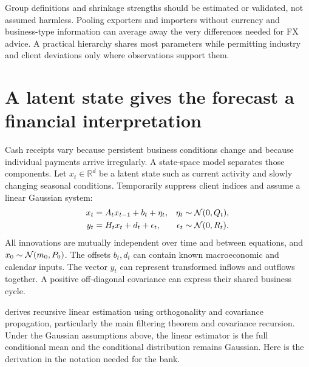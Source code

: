Group definitions and shrinkage strengths should be estimated or validated, not assumed harmless. Pooling exporters and importers without currency and business-type information can average away the very differences needed for FX advice. A practical hierarchy shares most parameters while permitting industry and client deviations only where observations support them.

\section{A latent state gives the forecast a financial interpretation}
\label{sec:kalman}
Cash receipts vary because persistent business conditions change and because individual payments arrive irregularly. A state-space model separates those components. Let $x_t\in\mathbb R^d$ be a latent state such as current activity and slowly changing seasonal conditions. Temporarily suppress client indices and assume a linear Gaussian system:
\begin{align}
x_t&=A_t x_{t-1}+b_t+\eta_t,&\eta_t&\sim\mathcal N(0,Q_t),\\
y_t&=H_t x_t+d_t+\epsilon_t,&\epsilon_t&\sim\mathcal N(0,R_t).
\label{eq:ssm}
\end{align}
All innovations are mutually independent over time and between equations, and $x_0\sim\mathcal N(m_0,P_0)$. The offsets $b_t,d_t$ can contain known macroeconomic and calendar inputs. The vector $y_t$ can represent transformed inflows and outflows together. A positive off-diagonal covariance can express their shared business cycle.

\citet{kalman1960} derives recursive linear estimation using orthogonality and covariance propagation, particularly the main filtering theorem and covariance recursion. Under the Gaussian assumptions above, the linear estimator is the full conditional mean and the conditional distribution remains Gaussian. Here is the derivation in the notation needed for the bank.

